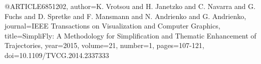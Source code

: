 @ARTICLE{6851202,
  author={K. {Vrotsou} and H. {Janetzko} and C. {Navarra} and G. {Fuchs} and D. {Spretke} and F. {Mansmann} and N. {Andrienko} and G. {Andrienko}},
  journal={IEEE Transactions on Visualization and Computer Graphics}, 
  title={SimpliFly: A Methodology for Simplification and Thematic Enhancement of Trajectories}, 
  year={2015},
  volume={21},
  number={1},
  pages={107-121},
  doi={10.1109/TVCG.2014.2337333}}